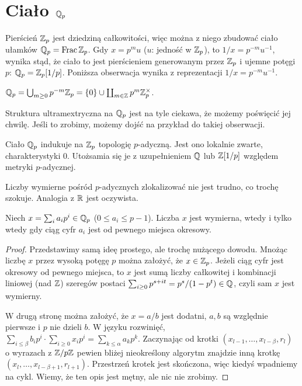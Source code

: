 \section{Ciało $\mathbb Q_p$}
Pierścień $\mathbb Z_p$ jest dziedziną całkowitości, więc można z niego zbudować ciało ułamków $\mathbb Q_p = \operatorname{Frac} \mathbb Z_p$.
Gdy $x = p^m u$ ($u$: jedność w $\mathbb Z_p$), to $1/x = p^{-m} u^{-1}$, wynika stąd, że ciało to jest pierścieniem generowanym przez $\mathbb Z_p$ i ujemne potęgi $p$: $\mathbb Q_p = \mathbb Z_p[1/p]$.
Poniższa obserwacja wynika z reprezentacji $1/x = p^{-m} u^{-1}$.

\begin{fakt}
	$\mathbb Q_p = \bigcup_{m \ge 0} p^{-m} \mathbb Z_p = \{0\} \cup \coprod_{m \in \mathbb Z} p^m \mathbb Z_p^\times$.
\end{fakt}


Struktura ultramextryczna na $\mathbb Q_p$ jest na tyle ciekawa, że możemy poświęcić jej chwilę.
Jeśli to zrobimy, możemy dojść na przykład do takiej obserwacji.

\begin{fakt}
	Ciało $\mathbb Q_p$ indukuje na $\mathbb Z_p$ topologię $p$-adyczną.
	Jest ono lokalnie zwarte, charakterystyki $0$.
	Utożsamia się je z uzupełnieniem $\mathbb Q$ lub $\mathbb Z[1/p]$ względem metryki $p$-adycznej.
\end{fakt}

Liczby wymierne pośród $p$-adycznych zlokalizować nie jest trudno, co trochę szokuje.
Analogia z $\mathbb R$ jest oczywista.

\begin{fakt}
	Niech $x = \sum_i a_i p^i \in \mathbb Q_p$ ($0 \le a_i \le p-1$).
	Liczba $x$ jest wymierna, wtedy i tylko wtedy gdy ciąg cyfr $a_i$ jest od pewnego miejsca okresowy.
\end{fakt}

\begin{proof}
	Przedstawimy samą ideę prostego, ale trochę nużącego dowodu.
	Mnożąc liczbę $x$ przez wysoką potęgę $p$ można założyć, że $x \in \mathbb Z_p$.
	Jeżeli ciąg cyfr jest okresowy od pewnego miejsca, to $x$ jest sumą liczby całkowitej i kombinacji liniowej (nad $\mathbb Z$) szeregów postaci $\sum_{i \ge 0} p^{s+it} = p^s / (1-p^t) \in \mathbb Q$, czyli sam $x$ jest wymierny.

	W drugą stronę można założyć, że $x = a/b$ jest dodatni, $a, b$ są względnie pierwsze i $p$ nie dzieli $b$.
	W języku rozwinięć, $\sum_{i \le \beta} b_i p^i \cdot \sum_{i \ge 0} x_i p^i = \sum_{k \le \alpha} a_kp^k$.
	Zaczynając od krotki $(x_{l-1}, \dots, x_{l - \beta}, r_l)$ o wyrazach z $\mathbb Z/p\mathbb Z$ pewien bliżej nieokreślony algorytm znajdzie inną krotkę $(x_{l}, \dots, x_{l - \beta+1}, r_{l+1})$.
	Przestrzeń krotek jest skończona, więc kiedyś wpadniemy na cykl.
	Wiemy, że ten opis jest mętny, ale nic nie zrobimy.
\end{proof}

